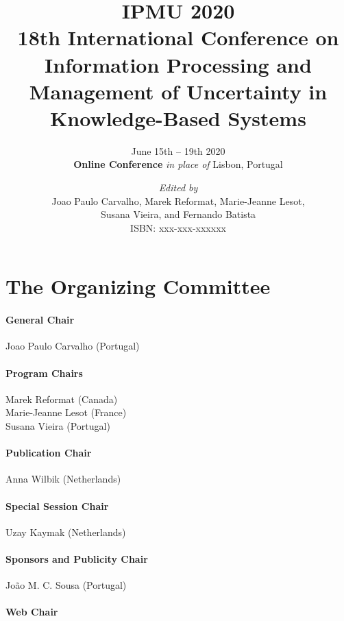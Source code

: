 \documentclass[11pt, twoside, b5paper]{extbook}
\title{\sffamily \textbf{IPMU 2020} \\[1ex]
18th International Conference on Information Processing and Management of Uncertainty in Knowledge-Based Systems}
\author{June 15th – 19th 2020\\[1ex]
{\bf Online Conference} {\em in place of} Lisbon, Portugal}
\date{
{\em Edited by}\\
\vspace{1em}
Joao Paulo Carvalho,
Marek Reformat, 
Marie-Jeanne Lesot,\\
Susana Vieira,
and Fernando Batista\\
\vspace{1em}
ISBN: xxx-xxx-xxxxxx
}
\begin{document}


\clearpage

\frontmatter
\maketitle


\begin{small}
\tableofcontents
\end{small}

\chapter*{The Organizing Committee}

\subsubsection*{General Chair}

Joao Paulo Carvalho (Portugal)

\subsubsection*{Program Chairs}

Marek Reformat (Canada)\\
Marie-Jeanne Lesot (France)\\
Susana Vieira (Portugal)

\subsubsection*{Publication Chair}

Anna Wilbik (Netherlands)

\subsubsection*{Special Session Chair}

Uzay Kaymak (Netherlands)

\subsubsection*{Sponsors and Publicity Chair}

João M. C. Sousa (Portugal)

\subsubsection*{Web Chair}
\end{document}
